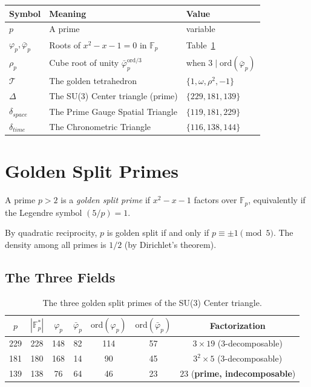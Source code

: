 \begin{center}
\begin{tabular}{@{}lll@{}}
\toprule
Symbol & Meaning & Value \\
\midrule
$p$ & A prime & variable \\
$\varphi_p, \bar\varphi_p$ & Roots of $x^2 - x - 1 = 0$ in $\mathbb{F}_p$ & Table~\ref{tab:fields} \\
$\rho_p$ & Cube root of unity $\bar\varphi_p^{\mathrm{ord}/3}$ & when $3 \mid \mathrm{ord}(\bar\varphi_p)$ \\
$\mathcal{T}$ & The golden tetrahedron & $\{1, \omega, \rho^2, -1\}$ \\
$\Delta$ & The SU(3) Center triangle (prime) & $\{229, 181, 139\}$ \\
$\delta_{space}$ & The Prime Gauge Spatial Triangle & $\{119, 181, 229\}$ \\
$\delta_{time}$ & The Chronometric Triangle & $\{116, 138, 144\}$ \\
\bottomrule
\end{tabular}
\end{center}

\section{Golden Split Primes}
\label{sec:golden}

\begin{definition}
\label{def:golden}
A prime $p > 2$ is a \emph{golden split prime} if $x^2 - x - 1$
factors over $\mathbb{F}_p$, equivalently if the Legendre symbol
$(5/p) = 1$.
\end{definition}

By quadratic reciprocity, $p$ is golden split if and only if
$p \equiv \pm 1 \pmod{5}$. The density among all primes is $1/2$
(by Dirichlet's theorem).

\subsection{The Three Fields}

\begin{table}[h]
\centering
\caption{The three golden split primes of the SU(3) Center triangle.}
\label{tab:fields}
\begin{tabular}{@{}ccccccc@{}}
\toprule
$p$ & $|{\mathbb{F}_p^*}|$ & $\varphi_p$ & $\bar\varphi_p$
    & $\mathrm{ord}(\varphi_p)$ & $\mathrm{ord}(\bar\varphi_p)$
    & Factorization \\
\midrule
229 & 228 & 148 & 82  & 114 & 57  & $3 \times 19$ (3-decomposable) \\
181 & 180 & 168 & 14  &  90 & 45  & $3^2 \times 5$ (3-decomposable) \\
139 & 138 &  76 & 64  &  46 & 23  & $23$ (\textbf{prime, indecomposable}) \\
\bottomrule
\end{tabular}
\end{table}

